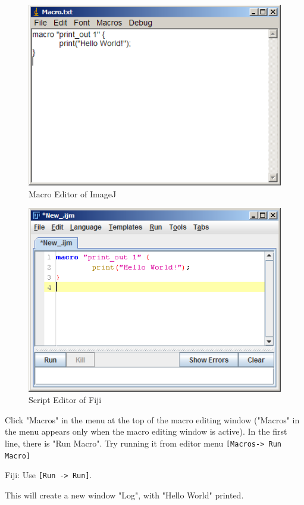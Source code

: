\documentclass[11pt,a4paper,oneside]{report}
\newenvironment{indentFiji}%
{\begin{list}{}%
         {\setlength{\leftmargin}{1em}}%
         \item[]%
}
{\end{list}}
\newcommand{\ijmenu}[1]{\texttt{\small#1}}
\begin{document}
\begin{figure}[htbp]
\begin{center}
\includegraphics[scale=0.6]{fig/editor_helloworld_IJ.png}
\caption{Macro Editor of ImageJ} \label{fig_MacroEditor}
\end{center}
\end{figure}

\begin{figure}[htbp]
\begin{center}
\includegraphics[scale=0.6]{fig/editor_helloworld_fiji.png}
\caption{Script Editor of Fiji} \label{fig_ScriptEditor}
\end{center}
\end{figure}

Click "Macros" in the menu at the top of the macro editing window ("Macros" in the menu appears only when the macro editing window is active). In the first line, there is "Run Macro". Try running it from editor menu \ijmenu{[Macros-> Run Macro]} 
\begin{indentFiji}
Fiji:  Use \ijmenu{[Run -> Run]}. 
\end{indentFiji}
This will create a new window "Log", with "Hello World" printed. \\
\end{document}
